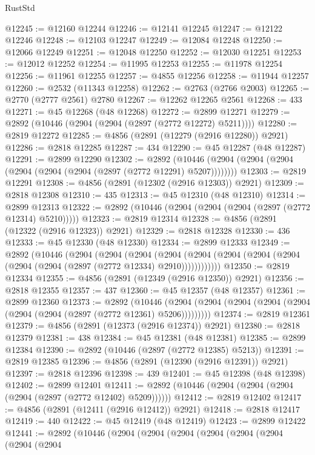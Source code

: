 \begin{lexlean}{RustStd}
\begin{coremodule}
@12245 := @12160 @12244
@12246 := @12141 @12245
@12247 := @12122 @12246
@12248 := @12103 @12247
@12249 := @12084 @12248
@12250 := @12066 @12249
@12251 := @12048 @12250
@12252 := @12030 @12251
@12253 := @12012 @12252
@12254 := @11995 @12253
@12255 := @11978 @12254
@12256 := @11961 @12255
@12257 := @4855 @12256
@12258 := @11944 @12257
@12260 := @2532 (@11343 @12258)
@12262 := @2763 (@2766 @2003)
@12265 := @2770 (@2777 @2561) @2780
@12267 := @12262 @12265 @2561
@12268 := 433
@12271 := @45 @12268 (@48 @12268)
@12272 := @2899 @12271
@12279 := @2892 (@10446 (@2904 (@2904 (@2897 (@2772 @12272) @5211))))
@12280 := @2819 @12272
@12285 := @4856 (@2891 (@12279 (@2916 @12280)) @2921)
@12286 := @2818 @12285
@12287 := 434
@12290 := @45 @12287 (@48 @12287)
@12291 := @2899 @12290
@12302 := @2892
    (@10446 (@2904 (@2904 (@2904 (@2904 (@2904 (@2904 (@2897 (@2772 @12291) @5207))))))))
@12303 := @2819 @12291
@12308 := @4856 (@2891 (@12302 (@2916 @12303)) @2921)
@12309 := @2818 @12308
@12310 := 435
@12313 := @45 @12310 (@48 @12310)
@12314 := @2899 @12313
@12322 := @2892 (@10446 (@2904 (@2904 (@2904 (@2897 (@2772 @12314) @5210)))))
@12323 := @2819 @12314
@12328 := @4856 (@2891 (@12322 (@2916 @12323)) @2921)
@12329 := @2818 @12328
@12330 := 436
@12333 := @45 @12330 (@48 @12330)
@12334 := @2899 @12333
@12349 := @2892
    (@10446
      (@2904
        (@2904
          (@2904
            (@2904 (@2904 (@2904 (@2904 (@2904 (@2904 (@2904 (@2897 (@2772 @12334) @2910))))))))))))
@12350 := @2819 @12334
@12355 := @4856 (@2891 (@12349 (@2916 @12350)) @2921)
@12356 := @2818 @12355
@12357 := 437
@12360 := @45 @12357 (@48 @12357)
@12361 := @2899 @12360
@12373 := @2892
    (@10446 (@2904 (@2904 (@2904 (@2904 (@2904 (@2904 (@2904 (@2897 (@2772 @12361) @5206)))))))))
@12374 := @2819 @12361
@12379 := @4856 (@2891 (@12373 (@2916 @12374)) @2921)
@12380 := @2818 @12379
@12381 := 438
@12384 := @45 @12381 (@48 @12381)
@12385 := @2899 @12384
@12390 := @2892 (@10446 (@2897 (@2772 @12385) @5213))
@12391 := @2819 @12385
@12396 := @4856 (@2891 (@12390 (@2916 @12391)) @2921)
@12397 := @2818 @12396
@12398 := 439
@12401 := @45 @12398 (@48 @12398)
@12402 := @2899 @12401
@12411 := @2892 (@10446 (@2904 (@2904 (@2904 (@2904 (@2897 (@2772 @12402) @5209))))))
@12412 := @2819 @12402
@12417 := @4856 (@2891 (@12411 (@2916 @12412)) @2921)
@12418 := @2818 @12417
@12419 := 440
@12422 := @45 @12419 (@48 @12419)
@12423 := @2899 @12422
@12441 := @2892
    (@10446
      (@2904
        (@2904
          (@2904
            (@2904
              (@2904
                (@2904
                  (@2904
                    (@2904

\end{coremodule}
\end{lexlean}
